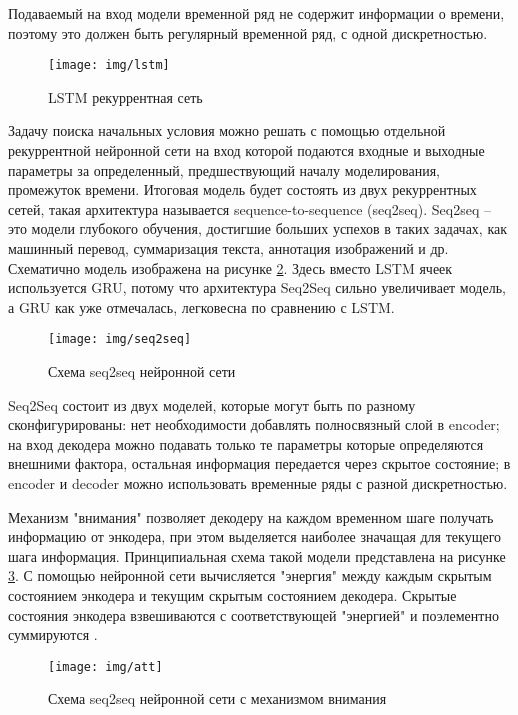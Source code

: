 \documentclass[12pt,a4paper]{article}
\begin{document}
Подаваемый на вход модели временной ряд не содержит информации о времени, поэтому это должен быть регулярный временной ряд, с одной дискретностью.

\begin{figure}[htb]
	\centering\texttt{[image: img/lstm]}
	\caption{LSTM рекуррентная сеть}
	\label{fig:lstm}
\end{figure}

Задачу поиска начальных условия можно решать с помощью отдельной рекуррентной нейронной сети на вход которой подаются входные и выходные параметры за определенный, предшествующий началу моделирования, промежуток времени. Итоговая модель будет состоять из двух рекуррентных сетей, такая архитектура называется sequence-to-sequence (seq2seq). Seq2seq – это модели глубокого обучения, достигшие больших успехов в таких задачах, как машинный перевод, суммаризация текста, аннотация изображений и др. Схематично модель изображена на рисунке \ref{fig:seq2seq}. Здесь вместо LSTM ячеек используется GRU, потому что архитектура Seq2Seq сильно увеличивает модель, а GRU как уже отмечалась, легковесна по сравнению с LSTM.

\begin{figure}[htb]
	\centering\texttt{[image: img/seq2seq]}
	\caption{Схема seq2seq нейронной сети}
	\label{fig:seq2seq}
\end{figure}

Seq2Seq состоит из двух моделей, которые могут быть по разному сконфигурированы: нет необходимости добавлять полносвязный слой в encoder; на вход декодера можно подавать только те параметры которые определяются внешними фактора, остальная информация передается через скрытое состояние; в encoder и decoder можно использовать временные ряды с разной дискретностью.


Механизм "внимания" позволяет декодеру на каждом временном шаге получать информацию от энкодера, при этом выделяется наиболее значащая для текущего шага информация. Принципиальная схема такой модели представлена на рисунке \ref{fig:att}. С помощью нейронной сети вычисляется "энергия" между каждым скрытым состоянием энкодера и текущим скрытым состоянием декодера. Скрытые состояния энкодера  взвешиваются с соответствующей "энергией" и поэлементно суммируются \cite{medium_brenner}.

\begin{figure}[htb]
	\centering\texttt{[image: img/att]}
	\caption{Схема seq2seq нейронной сети с механизмом внимания}
	\label{fig:att}
\end{figure}
\end{document}
